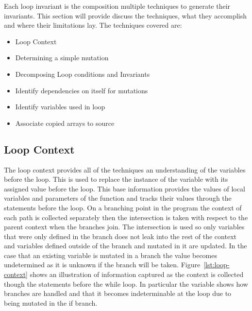 Each loop invariant is the composition multiple techniques to generate their
invariants. This section will provide discuss the techniques, what they
accomplish and where their limitations lay.
The techniques covered are:

\begin{itemize}
    \item{Loop Context}
    \item{Determining a simple mutation}
    \item{Decomposing Loop conditions and Invariants}
    \item{Identify dependencies on itself for mutations}
    \item{Identify variables used in loop}
    \item{Associate copied arrays to source}
\end{itemize}

\subsection{Loop Context}\label{s:loop-context}


The loop context provides all of the techniques an understanding of the
variables before the loop.
This is used to replace the instance of the variable with its assigned value
before the loop.
This base information provides the values of local variables and parameters of
the function and tracks their values through the statements before the loop.
On a branching point in the program the context of each path is collected
separately then the intersection is taken with respect to the
parent context when the branches join.
The intersection is used so only variables that were only defined in the
branch does not leak into the rest of the context and variables defined outside
of the branch and mutated in it are updated.
In the case that an existing variable is mutated in a branch the value becomes
undetermined as it is unknown if the branch will be taken.
Figure~\ref{lst:loop-context} shows an illustration of information captured as
the context is collected though the statements before the while loop.
In particular the variable  shows how branches are handled
and that it becomes indeterminable at the loop due to being mutated in the if
branch.

